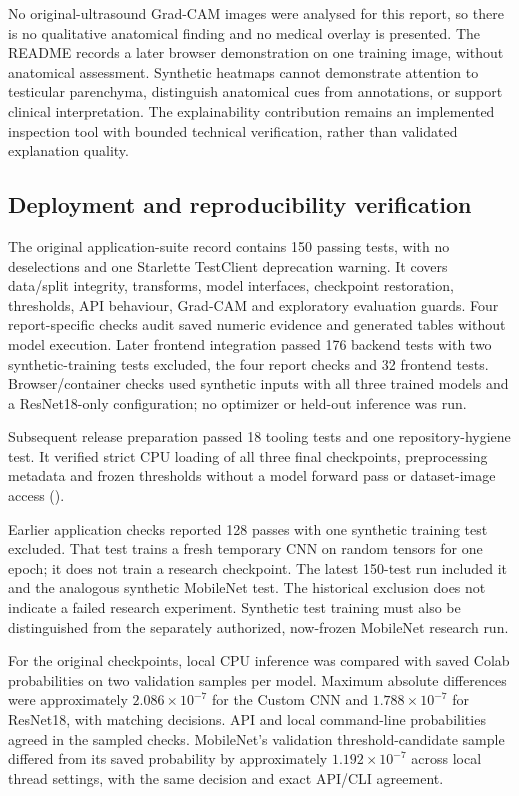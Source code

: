 \documentclass[11pt,a4paper]{article}
\newcommand{\code}[1]{\texttt{\detokenize{#1}}}
\begin{document}
No original-ultrasound Grad-CAM images were analysed for this report, so there is no qualitative anatomical finding and no medical overlay is presented. The README records a later browser demonstration on one training image, without anatomical assessment. Synthetic heatmaps cannot demonstrate attention to testicular parenchyma, distinguish anatomical cues from annotations, or support clinical interpretation. The explainability contribution remains an implemented inspection tool with bounded technical verification, rather than validated explanation quality.

\subsection{Deployment and reproducibility verification}
The original application-suite record contains 150 passing tests, with no deselections and one Starlette TestClient deprecation warning. It covers data/split integrity, transforms, model interfaces, checkpoint restoration, thresholds, API behaviour, Grad-CAM and exploratory evaluation guards. Four report-specific checks audit saved numeric evidence and generated tables without model execution. Later frontend integration passed 176 backend tests with two synthetic-training tests excluded, the four report checks and 32 frontend tests. Browser/container checks used synthetic inputs with all three trained models and a ResNet18-only configuration; no optimizer or held-out inference was run.

Subsequent release preparation passed 18 tooling tests and one repository-hygiene test. It verified strict CPU loading of all three final checkpoints, preprocessing metadata and frozen thresholds without a model forward pass or dataset-image access (\code{release/verification.json}).

Earlier application checks reported 128 passes with one synthetic training test excluded. That test trains a fresh temporary CNN on random tensors for one epoch; it does not train a research checkpoint. The latest 150-test run included it and the analogous synthetic MobileNet test. The historical exclusion does not indicate a failed research experiment. Synthetic test training must also be distinguished from the separately authorized, now-frozen MobileNet research run.

For the original checkpoints, local CPU inference was compared with saved Colab probabilities on two validation samples per model. Maximum absolute differences were approximately $2.086\times10^{-7}$ for the Custom CNN and $1.788\times10^{-7}$ for ResNet18, with matching decisions. API and local command-line probabilities agreed in the sampled checks. MobileNet's validation threshold-candidate sample differed from its saved probability by approximately $1.192\times10^{-7}$ across local thread settings, with the same decision and exact API/CLI agreement.
\end{document}
